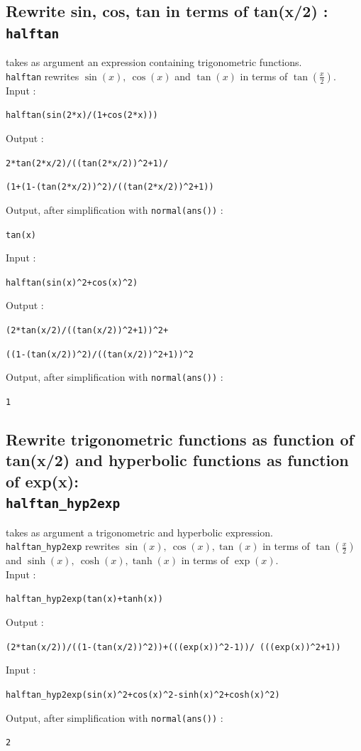 \documentclass[a4paper,11pt]{book}
\begin{document}
\subsection{Rewrite sin, cos, tan in terms of tan(x/2) : {\tt halftan}}
 takes as argument an expression 
containing trigonometric functions.\\
{\tt halftan} rewrites $\sin(x),\ \cos(x)$ and  $ \tan(x)$ 
 in terms of $\tan(\frac{x}{2})$.\\
Input :
\begin{center}{\tt halftan(sin(2*x)/(1+cos(2*x)))}\end{center}
Output :
\begin{center}{\tt 2*tan(2*x/2)/((tan(2*x/2))\verb|^|2+1)/}\end{center}
\begin{center}{\tt (1+(1-(tan(2*x/2))\verb|^|2)/((tan(2*x/2))\verb|^|2+1))}\end{center}
Output, after simplification with {\tt normal(ans())} :
\begin{center}{\tt tan(x)}\end{center}
Input :
\begin{center}{\tt halftan(sin(x)\verb|^|2+cos(x)\verb|^|2)}\end{center}
Output :
\begin{center}{\tt (2*tan(x/2)/((tan(x/2))\verb|^|2+1))\verb|^|2+}\end{center}
\begin{center}{\tt ((1-(tan(x/2))\verb|^|2)/((tan(x/2))\verb|^|2+1))\verb|^|2}\end{center}
Output, after simplification with {\tt normal(ans())} :
\begin{center}{\tt 1}\end{center}

\subsection{Rewrite trigonometric functions as function of tan(x/2) 
and hyperbolic functions as function of exp(x): \\
{\tt halftan\_hyp2exp}}
 takes as argument a trigonometric and  
hyperbolic expression.\\
{\tt halftan\_hyp2exp} rewrites $\sin(x),\ \cos(x), \tan(x)$ 
 in terms of $\tan(\frac{x}{2})$ 
and $\sinh(x),\ \cosh(x), \tanh(x)$ in terms of $\exp(x)$.\\
Input :
\begin{center}{\tt halftan\_hyp2exp(tan(x)+tanh(x))}\end{center}
Output :
\begin{center}{\tt (2*tan(x/2))/((1-(tan(x/2))\verb|^|2))+(((exp(x))\verb|^|2-1))/ (((exp(x))\verb|^|2+1))}\end{center}
Input :
\begin{center}{\tt halftan\_hyp2exp(sin(x)\verb|^|2+cos(x)\verb|^|2-sinh(x)\verb|^|2+cosh(x)\verb|^|2)}\end{center}
Output, after simplification with {\tt normal(ans())} :
\begin{center}{\tt 2}\end{center}
\end{document}

